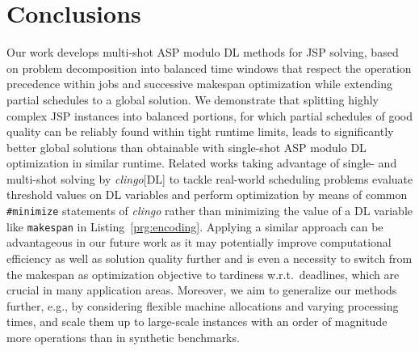 \documentclass{tlp} %
\newcommand{\clingo}{\emph{clingo}\xspace}
\newcommand{\clingodl}{\emph{clingo}[DL]\xspace}
\begin{document}
\section{Conclusions}\label{sec:conclusions}
%
Our work develops multi-shot ASP modulo DL methods for JSP solving,
based on problem decomposition into balanced time windows that respect the operation
precedence within jobs and successive makespan optimization while extending
partial schedules to a global solution.
We demonstrate that splitting highly complex JSP instances into
balanced portions, for which partial schedules of good quality can be reliably
found within tight runtime limits, leads to significantly better global solutions
than obtainable with single-shot ASP modulo DL optimization in similar runtime.
Related works taking advantage of single- \citep{abjoossctowa21a}
and multi-shot solving \citep{francescutto2021solving} by
\clingodl to tackle real-world scheduling problems evaluate threshold values
on DL variables and perform optimization by means of common 
\lstinline{#minimize} statements of \clingo rather than minimizing the
value of a DL variable like \lstinline{makespan} in Listing~\ref{prg:encoding}.
Applying a similar approach can be advantageous in our future work as it may
potentially improve computational efficiency as well as solution quality further
and is even a necessity to switch from the makespan as optimization objective to tardiness
w.r.t.\ deadlines, which are crucial in many application areas.
Moreover, we aim to generalize our methods further, e.g.,
by considering flexible machine allocations and varying processing times,
and scale them up to large-scale instances with an order of magnitude more
operations than in synthetic benchmarks.
%

%
%
%
% 
% 
%

\end{document}
